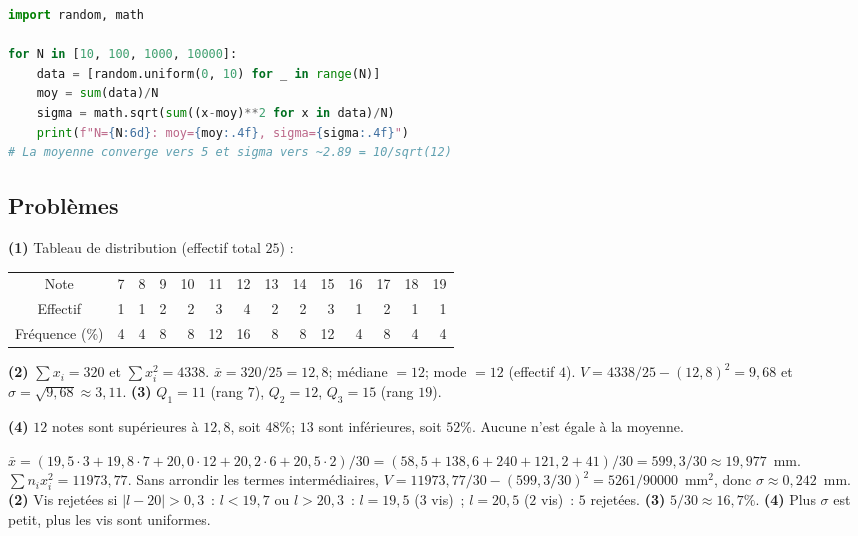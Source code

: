 
\begin{lstlisting}[language=Python]
import random, math

for N in [10, 100, 1000, 10000]:
    data = [random.uniform(0, 10) for _ in range(N)]
    moy = sum(data)/N
    sigma = math.sqrt(sum((x-moy)**2 for x in data)/N)
    print(f"N={N:6d}: moy={moy:.4f}, sigma={sigma:.4f}")
# La moyenne converge vers 5 et sigma vers ~2.89 = 10/sqrt(12)
\end{lstlisting}

\subsection*{Probl\`emes}


\textbf{(1)} Tableau de distribution (effectif total $25$) :
\begin{center}\small
\begin{tabular}{c|rrrrrrrrrrrrr}
Note & 7&8&9&10&11&12&13&14&15&16&17&18&19\\
Effectif &1&1&2&2&3&4&2&2&3&1&2&1&1\\
Fr\'equence (\%) &4&4&8&8&12&16&8&8&12&4&8&4&4
\end{tabular}
\end{center}
\textbf{(2)} $\sum x_i=320$ et $\sum x_i^2=4338$.
$\bar x=320/25=12{,}8$; m\'ediane $=12$; mode $=12$ (effectif $4$).
$V=4338/25-(12{,}8)^2=9{,}68$ et $\sigma=\sqrt{9{,}68}\approx3{,}11$.
\textbf{(3)} $Q_1=11$ (rang $7$), $Q_2=12$, $Q_3=15$ (rang $19$).
\begin{center}\end{center}
\textbf{(4)} $12$ notes sont sup\'erieures \`a $12{,}8$, soit $48\%$;
$13$ sont inf\'erieures, soit $52\%$. Aucune n'est \'egale \`a la moyenne.


$\bar{x}=(19{,}5\cdot3+19{,}8\cdot7+20{,}0\cdot12+20{,}2\cdot6+20{,}5\cdot2)/30=(58{,}5+138{,}6+240+121{,}2+41)/30=599{,}3/30\approx19{,}977$~mm.
$\sum n_ix_i^2=11973{,}77$.
Sans arrondir les termes interm\'ediaires,
$V=11973{,}77/30-(599{,}3/30)^2=5261/90000$~mm$^2$,
donc $\sigma\approx0{,}242$~mm.
\textbf{(2)} Vis rejet\'ees si $|l-20|>0{,}3$~: $l<19{,}7$ ou $l>20{,}3$~:
$l=19{,}5$ ($3$ vis)~; $l=20{,}5$ ($2$ vis)~: $5$ rejet\'ees.
\textbf{(3)} $5/30\approx16{,}7\%$.
\textbf{(4)} Plus $\sigma$ est petit, plus les vis sont uniformes.

